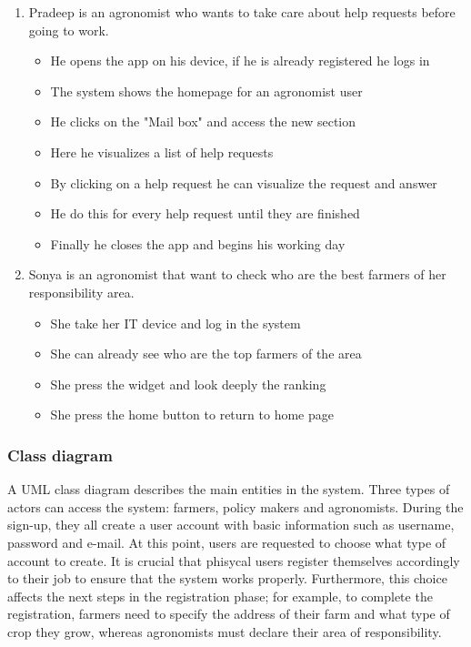 \documentclass[table, 12pt]{article}
\begin{document}
\begin{enumerate}
    \item Pradeep is an agronomist who wants to take care about help requests before going to work.
    \begin{itemize}
        \item He opens the app on his device, if he is already registered he logs in
        \item The system shows the homepage for an agronomist user
        \item He clicks on the "Mail box" and access the new section
        \item Here he visualizes a list of help requests
        \item By clicking on a help request he can visualize the request and answer 
        \item He do this for every help request until they are finished
        \item Finally he closes the app and begins his working day
    \end{itemize} 

    \item Sonya is an agronomist that want to check who are the best farmers of her responsibility area.
    \begin{itemize}
        \item She take her IT device and log in the system 
        \item She can already see who are the top farmers of the area
        \item She press the widget and look deeply the ranking
        \item She press the home button to return to home page
    \end{itemize}
\end{enumerate}


\subsubsection{Class diagram}
A UML class diagram describes the main entities in the system.
Three types of actors can access the system: farmers, policy makers and agronomists.
During the sign-up, they all create a user account with basic information such as username, password and e-mail.
At this point, users are requested to choose what type of account to create. It is crucial that phisycal users register themselves accordingly to their job to ensure that the system works properly. Furthermore, this choice affects the next steps in the registration phase; for example, to complete the registration, farmers need to specify the address of their farm and what type of crop they grow, whereas agronomists must declare their area of responsibility.
\end{document}

